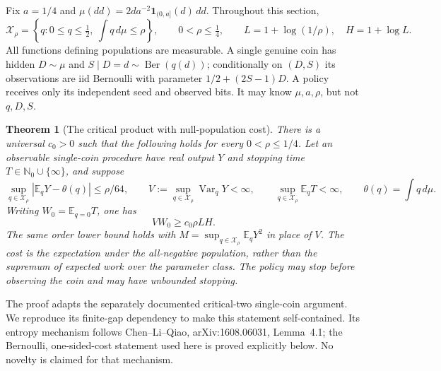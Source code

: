 \documentclass[11pt]{article}
\newtheorem{theorem}{Theorem}
\begin{document}
Fix $a=1/4$ and $\mu(dd)=2d a^{-2}\mathbf1_{(0,a]}(d)\,dd$.
Throughout this section,
\[
 \mathcal X_\rho=\left\{q:0\le q\le\tfrac12,
                    \ \int q\,d\mu\le\rho\right\},
 \qquad 0<\rho\le\tfrac14,
 \qquad L=1+\log(1/\rho),\quad H=1+\log L.
\]
All functions defining populations are measurable. A single genuine coin
has hidden $D\sim\mu$ and $S\mid D=d\sim\operatorname{Ber}(q(d))$;
conditionally on $(D,S)$ its observations are iid Bernoulli with parameter
$1/2+(2S-1)D$. A policy receives only its independent seed and observed
bits. It may know $\mu,a,\rho$, but not $q,D,S$.

\begin{theorem}[The critical product with null-population cost]
\label{thm:base-cost}
There is a universal $c_0>0$ such that the following holds for every
$0<\rho\le1/4$. Let an observable single-coin procedure have real output
$Y$ and stopping time $T\in\mathbb N_0\cup\{\infty\}$, and suppose
\[
 \sup_{q\in\mathcal X_\rho}|\mathbb E_qY-\theta(q)|\le\rho/64,
 \qquad
 V:=\sup_{q\in\mathcal X_\rho}\operatorname{Var}_qY<\infty,
 \qquad
 \sup_{q\in\mathcal X_\rho}\mathbb E_qT<\infty,
 \qquad \theta(q)=\int q\,d\mu.
\]
Writing $W_0=\mathbb E_{q=0}T$, one has
\[
                 V W_0\ge c_0\rho L H.                 \tag{BC1}
\]
The same order lower bound holds with
$M=\sup_{q\in\mathcal X_\rho}\mathbb E_qY^2$ in place of $V$.
The cost is the expectation under the all-negative population, rather
than the supremum of expected work over the parameter class. The policy
may stop before observing the coin and may have unbounded stopping.
\end{theorem}

The proof adapts the separately documented critical-two single-coin
argument. We reproduce its finite-gap dependency to make this statement
self-contained. Its entropy mechanism follows Chen--Li--Qiao,
arXiv:1608.06031, Lemma~4.1; the Bernoulli, one-sided-cost statement used
here is proved explicitly below. No novelty is claimed for that mechanism.
\end{document}
